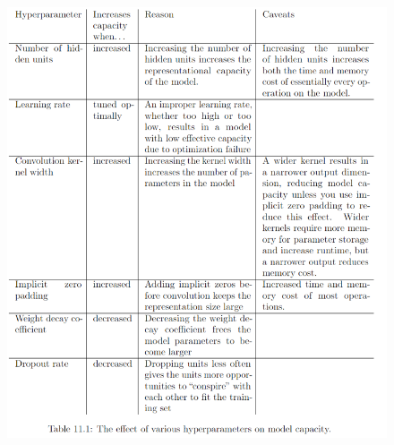 \begin{multicols}{2}
	\begin{figure}[H]
		\centering
		\includegraphics[width=1\linewidth]{images/hypertable.png}
	\end{figure}

\end{multicols}
